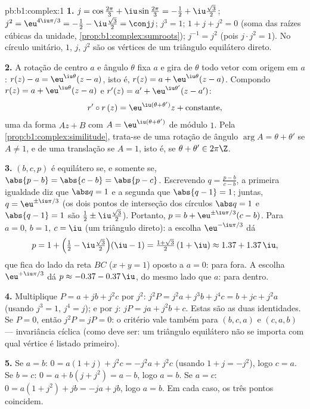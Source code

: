 \begin{solution}{pb:b1:complex:1}
\textbf{1.} $j = \cos\frac{2\pi}3 + \iu\sin\frac{2\pi}3 = -\frac12
+ \iu\frac{\sqrt3}2$; $j^2 = \eu^{4\iu\pi/3} = -\frac12 -
\iu\frac{\sqrt3}2 = \conj j$; $j^3 = 1$; $1 + j + j^2 = 0$ (soma das
raízes cúbicas da unidade, \cref{prop:b1:complex:sumroots}); $j^{-1}
= j^2$
(pois $j \cdot j^2 = 1$). No círculo unitário, $1$, $j$,
$j^2$ são os vértices de um triângulo equilátero direto.

\textbf{2.} A rotação de centro $a$ e ângulo $\theta$ fixa $a$
e gira de $\theta$ todo vetor com origem em $a$: $r(z) - a =
\eu^{\iu\theta}(z - a)$, isto é, $r(z) = a + \eu^{\iu\theta}(z - a)$.
Compondo $r(z) = a + \eu^{\iu\theta}(z-a)$ e $r'(z) = a' +
\eu^{\iu\theta'}(z-a')$:
\[
r' \circ r\,(z) = \eu^{\iu(\theta + \theta')} z +
\text{constante},
\]
uma  da forma $Az + B$ com $A = \eu^{\iu(\theta+\theta')}$ de
módulo $1$. Pela \cref{prop:b1:complex:similitude}, trata-se de uma rotação
de ângulo $\arg A = \theta + \theta'$ se $A \neq 1$, e de uma
translação se $A = 1$, isto é, se $\theta + \theta' \in 2\pi\Z$.

\textbf{3.} $(b, c, p)$ é equilátero se, e somente se, $\abs{p - b} = \abs{c -
b} = \abs{p - c}$. Escrevendo $q = \frac{p - b}{c - b}$, a primeira
igualdade diz que $\abs q = 1$ e a segunda que $\abs{q - 1} = 1$;
juntas, $q = \eu^{\pm\iu\pi/3}$ (os dois pontos de interseção dos
círculos $\abs q = 1$ e $\abs{q - 1} = 1$ são $\frac12 \pm
\iu\frac{\sqrt3}2$). Portanto, $p = b + \eu^{\pm\iu\pi/3}(c - b)$. Para
$a = 0$, $b = 1$, $c = \iu$ (um triângulo direto): a escolha
$\eu^{-\iu\pi/3}$ dá
\[
p = 1 + \Bigl(\tfrac12 - \iu\tfrac{\sqrt3}2\Bigr)(\iu - 1)
= \tfrac{1 + \sqrt3}2\,(1 + \iu) \approx 1.37 + 1.37\,\iu ,
\]
que fica do lado da reta $BC$ ($x + y = 1$) oposto a $a
= 0$: para fora. A escolha $\eu^{+\iu\pi/3}$ dá $p \approx -0.37
- 0.37\,\iu$, do mesmo lado que $a$: para dentro.

\textbf{4.} Multiplique $P = a + jb + j^2c$ por $j^2$: $j^2 P = j^2 a +
j^3 b + j^4 c = b + jc + j^2 a$ (usando $j^3 = 1$, $j^4 = j$); e
por $j$: $jP = ja + j^2 b + c$. Estas são as duas identidades. Se $P
= 0$, então $j^2 P = jP = 0$: o critério vale também para $(b, c, a)$ e
$(c, a, b)$ --- invariância cíclica (como deve ser: um triângulo
equilátero não se importa com qual vértice é listado primeiro).

\textbf{5.} Se $a = b$: $0 = a(1 + j) + j^2 c = -j^2 a + j^2 c$
(usando $1 + j = -j^2$), logo $c = a$. Se $b = c$: $0 = a + b(j + j^2)
= a - b$, logo $a = b$. Se $a = c$: $0 = a(1 + j^2) + jb = -ja + jb$,
logo $a = b$. Em cada caso, os três pontos coincidem.


\end{solution}

